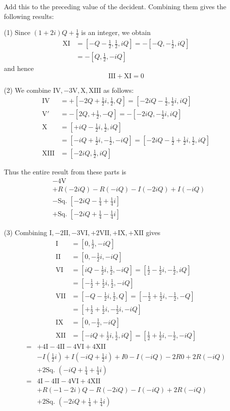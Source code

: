 Add this to the preceding value of the decident. Combining them gives the following results:

(1) Since $(1+2i)Q+\frac12$ is an integer, we obtain
\[
\begin{aligned}
\mathrm{XI}&=[-Q-\tfrac12,\tfrac12,iQ]= -[-Q,-\tfrac12,iQ]\\
&=-[Q,\tfrac12,-iQ]
\end{aligned}
\]
and hence
\[
\mathrm{III}+\mathrm{XI}=0
\]

(2) We combine $\mathrm{IV},-3\mathrm{V},\mathrm{X},\mathrm{XIII}$ as follows:
\[
\begin{aligned}
\mathrm{IV}&=+[-2Q+\tfrac12i,\tfrac12,Q]=[-2iQ-\tfrac12,\tfrac12i,iQ]\\
\mathrm{V}'&=-[2Q,+\tfrac12,-Q]=-[-2iQ,-\tfrac12i,iQ]\\
\mathrm{X}&=[+iQ-\tfrac12i,\tfrac12,iQ]\\
&=[-iQ+\tfrac12i,-\tfrac12,-iQ]=[-2iQ-\tfrac12+\tfrac12i,\tfrac12,iQ]\\
\mathrm{XIII}&=[-2iQ,\tfrac12,iQ]
\end{aligned}
\]


Thus the entire result from these parts is
\[
\begin{aligned}
&-4\mathrm{V}\\
&+R(-2iQ)-R(-iQ)-I(-2iQ)+I(-iQ)\\
&-\text{Sq. }[-2iQ-\tfrac14+\tfrac14i]\\
&+\text{Sq. }[-2iQ+\tfrac14-\tfrac14i]
\end{aligned}
\]

(3) Combining $\mathrm{I},-2\mathrm{II},-3\mathrm{VI},+2\mathrm{VII},+\mathrm{IX},+\mathrm{XII}$ gives
\[
\begin{aligned}
\mathrm{I}&=[0,\tfrac12,-iQ]\\
\mathrm{II}&=[0,-\tfrac12i,-iQ]\\
\mathrm{VI}&=[iQ-\tfrac12i,\tfrac12,-iQ]=[\tfrac12-\tfrac12i,-\tfrac12,iQ]\\
&=[-\tfrac12+\tfrac12i,\tfrac12,-iQ]\\
\mathrm{VII}&=[-Q-\tfrac12i,\tfrac12,Q]=[-\tfrac12+\tfrac12i,-\tfrac12,-Q]\\
&=[+\tfrac12+\tfrac12i,-\tfrac12i,-iQ]\\
\mathrm{IX}&=[0,-\tfrac12,-iQ]\\
\mathrm{XII}&=[-iQ+\tfrac12i,\tfrac12,iQ]=[\tfrac12+\tfrac12i,-\tfrac12,-iQ]
\end{aligned}
\]
\[
\begin{aligned}
={}&+4\mathrm{I}-4\mathrm{II}-4\mathrm{VI}+4\mathrm{XII}\\
&-I(\tfrac12i)+I(-iQ+\tfrac12i)+I0-I(-iQ)-2R0+2R(-iQ)\\
&+2\text{Sq. }(-iQ+\tfrac14+\tfrac14i)\\
={}&4\mathrm{I}-4\mathrm{II}-4\mathrm{VI}+4\mathrm{XII}\\
&+R(-1-2i)Q-R(-2iQ)-I(-iQ)+2R(-iQ)\\
&+2\text{Sq. }(-2iQ+\tfrac14+\tfrac14i)
\end{aligned}
\]

